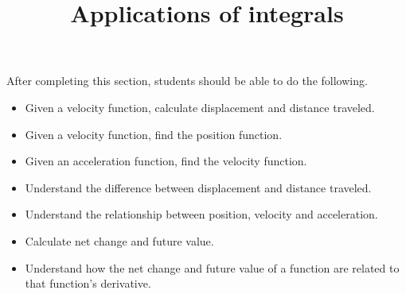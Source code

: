 \documentclass{ximera}
\title{Applications of integrals}
\begin{document}
\begin{abstract}
\end{abstract}

\maketitle

\begin{sectionOutcomes}

After completing this section, students should be able to do the following.

\begin{itemize}
	\item Given a velocity function, calculate displacement and distance traveled.
	\item Given a velocity function, find the position function.
	\item Given an acceleration function, find the velocity function.
	\item Understand the difference between displacement and distance traveled.
	\item Understand the relationship between position, velocity and acceleration.
	\item Calculate net change and future value.
	\item Understand how the net change and future value of a function are related to that function's derivative.
\end{itemize}

\end{sectionOutcomes}
\end{document}
